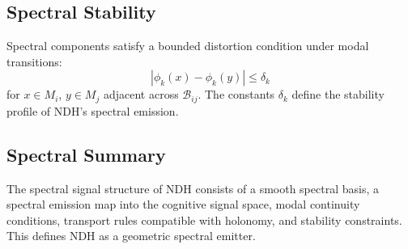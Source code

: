 \subsection{Spectral Stability}

Spectral components satisfy a bounded distortion condition under modal
transitions:
\[
|\phi_k(x) - \phi_k(y)| \le \delta_k
\]
for $x \in M_i$, $y \in M_j$ adjacent across $\mathcal{B}_{ij}$. The constants
$\delta_k$ define the stability profile of NDH's spectral emission.

\subsection{Spectral Summary}

The spectral signal structure of NDH consists of a smooth spectral basis, a
spectral emission map into the cognitive signal space, modal continuity
conditions, transport rules compatible with holonomy, and stability constraints.
This defines NDH as a geometric spectral emitter.
